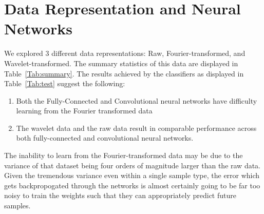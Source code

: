 \section{Data Representation and Neural Networks} \label{data representation}
We explored 3 different data representations: Raw, Fourier-transformed, and Wavelet-transformed.
The summary statistics of this data are displayed in Table~\ref{Tab:summary}.
The results achieved by the classifiers as displayed in Table~\ref{Tab:test} suggest the following:
\begin{enumerate}
\item Both the Fully-Connected and Convolutional neural networks have difficulty learning from the Fourier transformed data
\item The wavelet data and the raw data result in comparable performance across both fully-connected and convolutional neural networks.
\end{enumerate}

The inability to learn from the Fourier-transformed data may be due to the variance of that dataset being four orders of magnitude larger than the raw data.
Given the tremendous variance even within a single sample type, the error which gets backpropogated through the networks is almost certainly going to be far too noisy to train the weights such that they can appropriately predict future samples. 
